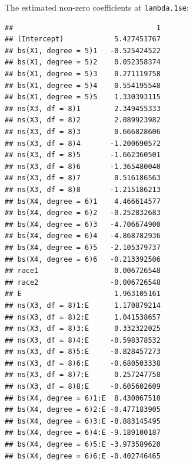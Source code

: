 \documentclass[12pt,letter]{article}\usepackage[]{graphicx}\usepackage[]{color}
\makeatletter
\newenvironment{kframe}{%
 \def\at@end@of@kframe{}%
 \ifinner\ifhmode%
  \def\at@end@of@kframe{\end{minipage}}%
  \begin{minipage}{\columnwidth}%
 \fi\fi%
 \def\FrameCommand##1{\hskip\@totalleftmargin \hskip-\fboxsep
 \colorbox{shadecolor}{##1}\hskip-\fboxsep
     \hskip-\linewidth \hskip-\@totalleftmargin \hskip\columnwidth}%
 \MakeFramed {\advance\hsize-\width
   \@totalleftmargin\z@ \linewidth\hsize
   \@setminipage}}%
 {\par\unskip\endMakeFramed%
 \at@end@of@kframe}
\newenvironment{knitrout}{}{} %
\makeatother
\begin{document}
The estimated non-zero coefficients at \texttt{lambda.1se}:

\begin{knitrout}\scriptsize
{}\color{fgcolor}\begin{kframe}
\begin{verbatim}
##                                  1
## (Intercept)            5.427451767
## bs(X1, degree = 5)1   -0.525424522
## bs(X1, degree = 5)2    0.052358374
## bs(X1, degree = 5)3    0.271119758
## bs(X1, degree = 5)4    0.554195548
## bs(X1, degree = 5)5    1.330393115
## ns(X3, df = 8)1        2.349455333
## ns(X3, df = 8)2        2.089923982
## ns(X3, df = 8)3        0.666828606
## ns(X3, df = 8)4       -1.200690572
## ns(X3, df = 8)5       -1.662360501
## ns(X3, df = 8)6       -1.365480040
## ns(X3, df = 8)7        0.516186563
## ns(X3, df = 8)8       -1.215186213
## bs(X4, degree = 6)1    4.466614577
## bs(X4, degree = 6)2   -0.252832683
## bs(X4, degree = 6)3   -4.706674900
## bs(X4, degree = 6)4   -4.868782936
## bs(X4, degree = 6)5   -2.105379737
## bs(X4, degree = 6)6   -0.213392506
## race1                  0.006726548
## race2                 -0.006726548
## E                      1.963105161
## ns(X3, df = 8)1:E      1.170879214
## ns(X3, df = 8)2:E      1.041538657
## ns(X3, df = 8)3:E      0.332322025
## ns(X3, df = 8)4:E     -0.598378532
## ns(X3, df = 8)5:E     -0.828457273
## ns(X3, df = 8)6:E     -0.680503338
## ns(X3, df = 8)7:E      0.257247758
## ns(X3, df = 8)8:E     -0.605602609
## bs(X4, degree = 6)1:E  8.430067510
## bs(X4, degree = 6)2:E -0.477183905
## bs(X4, degree = 6)3:E -8.883145495
## bs(X4, degree = 6)4:E -9.189100187
## bs(X4, degree = 6)5:E -3.973589620
## bs(X4, degree = 6)6:E -0.402746465
\end{verbatim}
\end{kframe}
\end{knitrout}
\end{document}

